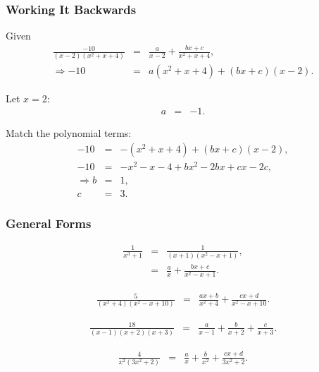 \begin{frame}
  \frametitle{Working It Backwards}
  
  Given
  \begin{eqnarray*}
    \frac{-10}{(x-2)(x^2+x+4)} & = & \frac{a}{x-2} + \frac{bx+c}{x^2+x+4}, \\
    \Rightarrow -10 & = & a(x^2+x+4) + (bx+c)(x-2).
  \end{eqnarray*}

  {
    Let $x=2$:
    \begin{eqnarray*}
      a & = & -1.
    \end{eqnarray*}

    Match the polynomial terms:
    \begin{eqnarray*}
      -10 & = & -(x^2+x+4) + (bx+c)(x-2), \\
      -10 & = & -x^2 - x - 4 + bx^2 - 2bx + cx - 2c, \\
      \Rightarrow b & = & 1, \\
      c & = & 3.
    \end{eqnarray*}
  }

\end{frame}


\begin{frame}
  \frametitle{General Forms}

  \begin{eqnarray*}
    \frac{1}{x^3+1} & = & \frac{1}{(x+1)(x^2-x+1)}, \\
    & = & \frac{a}{x} + \frac{bx+c}{x^2-x+1}.
  \end{eqnarray*}

  \begin{eqnarray*}
    \frac{5}{(x^2+4)(x^2-x+10)} & = & \frac{ax+b}{x^2+4} + \frac{cx+d}{x^2-x+10}.
  \end{eqnarray*}

  \begin{eqnarray*}
    \frac{18}{(x-1)(x+2)(x+3)} & = & \frac{a}{x-1} + \frac{b}{x+2} + \frac{c}{x+3}.
  \end{eqnarray*}


  \begin{eqnarray*}
    \frac{4}{x^2(3x^2+2)} & = & \frac{a}{x} + \frac{b}{x^2} + \frac{cx+d}{3x^2+2}.
  \end{eqnarray*}
  
\end{frame}




